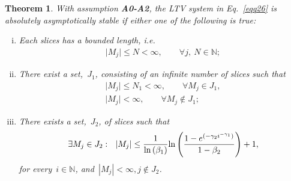 \documentclass[draftclsnofoot, onecolumn, 12pt]{IEEEtran}
\newtheorem{thm}{Theorem}
\def\ln{{\rm ln}}
\begin{document}
\begin{thm}\label{thm0}
With assumption {\bf{A0-A2}}, the LTV system in Eq.~\eqref{eqq26} is absolutely asymptotically stable if either one of the following is true:
\begin{enumerate}[(i)]
\item Each slices has a bounded length, i.e.
\begin{eqnarray}\label{51}
\vert M_j \vert \leq N < {\infty} , \qquad \forall j,~N \in \mathbb{N};
\end{eqnarray}

\item There exist a set,~$J_1$, consisting of an infinite number of slices such that 
\begin{eqnarray}
\vert M_{j} \vert \leq N_1 < {\infty}, \qquad \forall M_j\in J_1,\\
\vert M_{j} \vert < {\infty}, \qquad \forall M_j \notin J_1;
\end{eqnarray}

\item There exists a set,~$J_2$, of slices such that
\begin{eqnarray*}
\exists M_j \in J_2:~~\vert M_j \vert \leq \frac{1}{\ln\left({\beta_1}\right)}\ln\left(\frac{1 - e^{(-\gamma_2i^{-\gamma_1})}}{1-\beta_2}\right)+1,
\end{eqnarray*}
for every~$i \in \mathbb{N}$, and~$|M_j|<\infty,j\notin J_2$.
\end{enumerate}
\end{thm}
\end{document}
